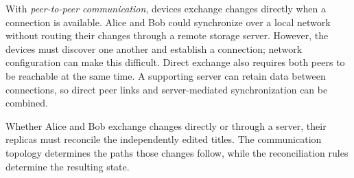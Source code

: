 With \emph{peer-to-peer communication}, devices exchange changes directly when a connection is available.
Alice and Bob could synchronize over a local network without routing their changes through a remote storage server.
However, the devices must discover one another and establish a connection; network configuration can make this difficult.
Direct exchange also requires both peers to be reachable at the same time.
A supporting server can retain data between connections, so direct peer links and server-mediated synchronization can be combined.
\parencite[173]{local-first-software}

Whether Alice and Bob exchange changes directly or through a server, their replicas must reconcile the independently edited titles.
The communication topology determines the paths those changes follow, while the reconciliation rules determine the resulting state.
